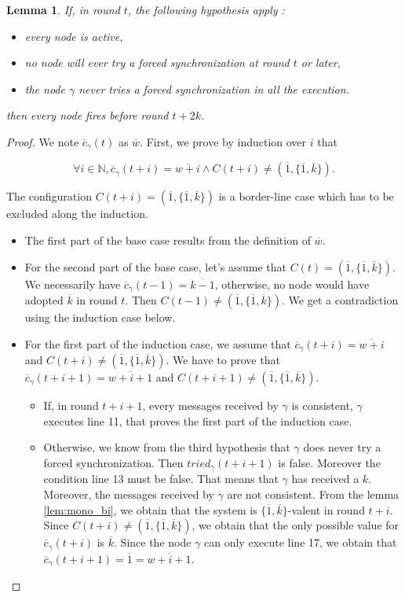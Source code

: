 \documentclass{article}
\newtheorem{lemma}{Lemma}[section]
\begin{document}
\begin{lemma}\label{lem:liv_main}
	If, in round $t$, the following hypothesis apply :
	\begin{itemize}
		\item every node is active,
		\item no node will ever try a forced synchronization at round $t$ or later,
		\item the node $\gamma$ never tries a forced synchronization in all the execution.
	\end{itemize}
	then every node fires before round $t+2k$.
\end{lemma}
\begin{proof}
	We note $\overline{c}_\gamma(t)$ as $\overline{w}$.
	First, we prove by induction over $i$ that

	$$\forall i \in \mathds{N}, \overline{c}_\gamma(t+i) = \overline{w+i} \wedge C(t+i) \neq (\overline{1}, \{\overline{1}, \overline{k}\}).$$

	The configuration $C(t+i) = (\overline{1}, \{\overline{1}, \overline{k}\})$ is a border-line case which has to be excluded along the induction.
	\begin{itemize}
		\item The first part of the base case results from the definition of $\overline{w}$.
		\item For the second part of the base case, let's assume that $C(t) = (\overline{1}, \{\overline{1}, \overline{k}\})$.
			We necessarily have $\overline{c}_\gamma(t-1) = \overline{k-1}$, otherwise, no node would have adopted $\overline{k}$ in round $t$.
			Then $C(t-1) \neq (\overline{1}, \{\overline{1}, \overline{k}\})$. We get a contradiction using the induction case below.
		\item For the first part of the induction case, we assume that $\overline{c}_\gamma(t+i) = \overline{w+i}$ and $C(t+i) \neq (\overline{1}, \{\overline{1}, \overline{k}\})$.
			We have to prove that $\overline{c}_\gamma(t+i+1) = \overline{w+i+1}$ and $C(t+i+1) \neq (\overline{1}, \{\overline{1}, \overline{k}\})$.

			\begin{itemize}
				\item If, in round $t+i+1$, every messages received by $\gamma$ is consistent, $\gamma$ executes line 11, that proves the first part of the induction case.
				\item Otherwise, we know from the third hypothesis that $\gamma$ does never try a forced synchronization.
					Then $tried_\gamma(t+i+1)$ is false. Moreover the condition line 13 must be false.
					That means that $\gamma$ has received a $k$. Moreover, the messages received by $\gamma$ are not consistent.
					From the lemma \ref{lem:mono_bi}, we obtain that the system is $\{\overline{1}, \overline{k}\}$-valent in round $t+i$.
					Since $C(t+i) \neq (\overline{1}, \{\overline{1}, \overline{k}\})$, we obtain that the only possible value for $\overline{c}_\gamma(t+i)$ is $\overline{k}$.
					Since the node $\gamma$ can only execute line 17, we obtain that $\overline{c}_\gamma(t+i+1) = \overline{1} = \overline{w+i+1}$.
			\end{itemize}


\end{itemize}
\end{proof}
\end{document}

